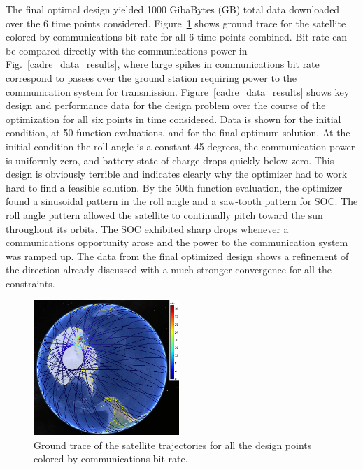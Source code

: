 \documentclass[]{aiaa-tc} %
\begin{document}
        The final optimal design yielded 1000 GibaBytes (GB) total data downloaded over the 6 time points considered.
        Figure~\ref{fig:trajectories} shows ground trace for the satellite colored by communications bit rate
        for all 6 time points combined. Bit rate can be compared directly with the communications power in
        Fig.~\ref{cadre_data_results}, where large spikes in communications bit rate correspond to passes over the ground station requiring
        power to the communication system for transmission. Figure~\ref{cadre_data_results} shows key design and performance data
        for the design problem over the course of the optimization for all six points in time considered. Data is shown for the
        initial condition, at 50 function evaluations, and for the final optimum solution. At the initial condition
        the roll angle is a constant 45 degrees, the communication power is uniformly zero, and battery state of charge drops quickly below zero.
        This design is obviously terrible and indicates clearly why the optimizer had to work hard to find a feasible solution.
        By the 50th function evaluation, the optimizer found a sinusoidal pattern in the roll angle and a saw-tooth pattern
        for SOC. The roll angle pattern allowed the satellite to continually pitch toward the sun throughout its orbits.
        The SOC exhibited sharp drops whenever a communications opportunity arose and the power to the communication system was ramped up.
        The data from the final optimized design shows a refinement of the direction already discussed with a much stronger convergence for
        all the constraints.

        \begin{figure}[!htb]
            \centering
            \includegraphics[width=0.49\textwidth]{images/allpts_gearth_mcmurdo}
            \caption{Ground trace of the satellite trajectories
            for all the design points colored by communications bit rate.
            \label{fig:trajectories}
            }
        \end{figure}
\end{document}
